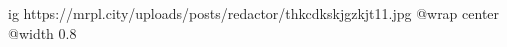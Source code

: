  
 
 
 
 

\ifcmt
  ig https://mrpl.city/uploads/posts/redactor/thkcdkskjgzkjt11.jpg
  @wrap center
  @width 0.8
\fi
